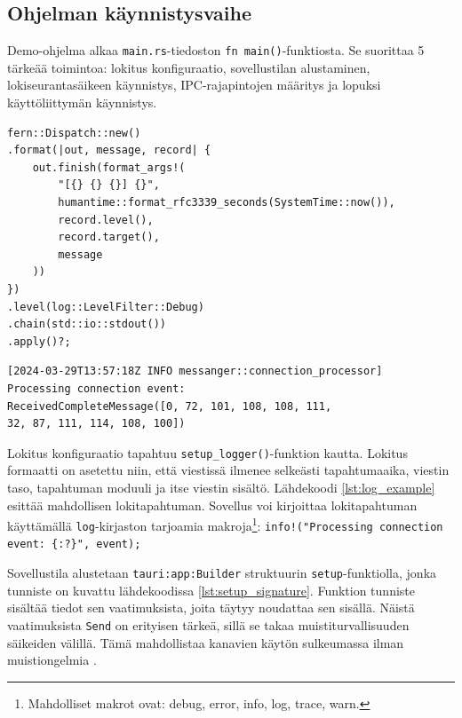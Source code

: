 \documentclass[a4paper,12pt]{article}
\begin{document}
    \subsection{Ohjelman käynnistysvaihe}

    Demo-ohjelma alkaa \lstinline{main.rs}-tiedoston \lstinline{fn main()}-funktiosta.
    Se suorittaa 5 tärkeää toimintoa: lokitus
    konfiguraatio, sovellustilan alustaminen, lokiseurantasäikeen käynnistys, IPC-rajapintojen määritys ja lopuksi käyttöliittymän käynnistys. \\

    \begin{lstlisting}[caption={Lokituskonfiguraatio}, label={lst:logging_config}]
fern::Dispatch::new()
.format(|out, message, record| {
    out.finish(format_args!(
        "[{} {} {}] {}",
        humantime::format_rfc3339_seconds(SystemTime::now()),
        record.level(),
        record.target(),
        message
    ))
})
.level(log::LevelFilter::Debug)
.chain(std::io::stdout())
.apply()?;
    \end{lstlisting}

    \begin{lstlisting}[caption={Esimerkki lokitapahtumasta}, label={lst:log_example}]
[2024-03-29T13:57:18Z INFO messanger::connection_processor]
Processing connection event:
ReceivedCompleteMessage([0, 72, 101, 108, 108, 111,
32, 87, 111, 114, 108, 100])
    \end{lstlisting}


    Lokitus konfiguraatio tapahtuu \lstinline{setup_logger()}-funktion kautta.
    Lokitus formaatti on asetettu niin, että viestissä ilmenee selkeästi tapahtumaaika,
    viestin taso, tapahtuman moduuli ja itse viestin sisältö. Lähdekoodi \ref{lst:log_example} esittää mahdollisen lokitapahtuman. Sovellus voi kirjoittaa lokitapahtuman käyttämällä \lstinline{log}-kirjaston tarjoamia makroja\footnote{Mahdolliset makrot ovat: debug, error, info, log, trace, warn.}: \lstinline|info!("Processing connection event: {:?}", event);|\par



    Sovellustila alustetaan \lstinline{tauri:app:Builder} struktuurin \lstinline{setup}-funktiolla, jonka tunniste on kuvattu lähdekoodissa \ref{lst:setup_signature}. Funktion tunniste sisältää tiedot sen vaatimuksista, joita täytyy noudattaa sen sisällä. Näistä vaatimuksista \lstinline{Send} on erityisen tärkeä, sillä se takaa muistiturvallisuuden säikeiden välillä. Tämä mahdollistaa kanavien käytön sulkeumassa ilman muistiongelmia \cite[ch. 8.2]{rust-book}. \par
\end{document}
